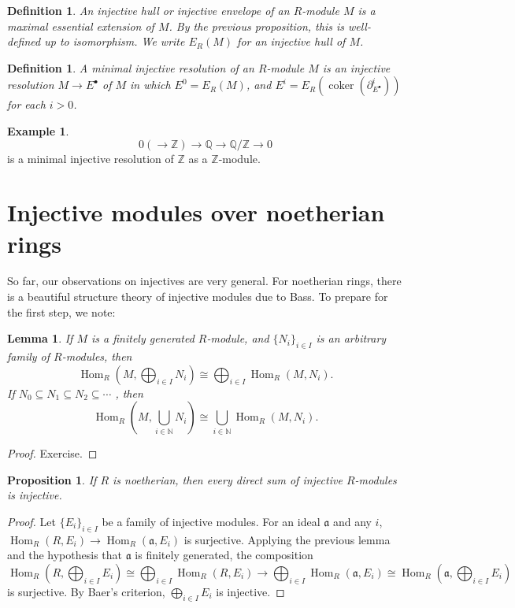 \documentclass[11pt]{book}
\newtheorem{lemma}[theorem]{Lemma}
\newtheorem{proposition}[theorem]{Proposition}
\newtheorem{definition}[theorem]{Definition}
\numberwithin{equation}{section}
\numberwithin{theorem}{chapter}
\theoremstyle{definition}
\newtheorem{example}[theorem]{Example}
\newtheorem*{basic properties}{Basic Properties}
\newtheorem*{Important Remark}{Important Remark}
\theoremstyle{remark}
\newcommand{\NN}{\mathbb{N}}
\newcommand{\ZZ}{\mathbb{Z}}
\newcommand{\QQ}{\mathbb{Q}}
\newcommand{\A}{\mathfrak{a}}
\newcommand{\Hom}{\operatorname{Hom}}
\newcommand{\coker}{\operatorname{coker}}
\begin{document}
\begin{definition}
	An \emph{injective hull} or \emph{injective envelope} of an $R$-module $M$ is a maximal essential extension of $M$. By the previous proposition, this is well-defined up to isomorphism. We write $E_R(M)$ for an injective hull of $M$.
\end{definition}



\begin{definition}
	A \emph{minimal injective resolution} of an $R$-module $M$ is an injective resolution $M \to E^{\bullet}$ of $M$ in which $E^0=E_R(M)$, and $E^i=E_R(\coker(\partial^i_{E^{\bullet}}))$ for each $i>0$.
\end{definition}

\begin{example}
	\[0 (\to \ZZ) \to \QQ \to \QQ/\ZZ \to 0 \] is a minimal injective resolution of $\ZZ$ as a $\ZZ$-module.
\end{example}

\section{Injective modules over noetherian rings}

So far, our observations on injectives are very general. For noetherian rings, there is a beautiful structure theory of injective modules due to Bass. To prepare for the first step, we note:

\begin{lemma} If $M$ is a finitely generated $R$-module, and $\{N_i\}_{i\in I}$ is an arbitrary family of $R$-modules, then 
	\[\Hom_R(M,\bigoplus_{i\in I} N_i)\cong \bigoplus_{i\in I} \Hom_R(M,N_i).\] If $N_0 \subseteq N_1 \subseteq N_2 \subseteq \cdots$ , then 
	\[\Hom_R(M,\bigcup_{i\in \NN} N_i) \cong \bigcup_{i\in \NN}\Hom_R(M, N_i).\]
	\end{lemma}
\begin{proof}
	Exercise.
\end{proof}

\begin{proposition}\label{prop: direct sum of injective}
	If $R$ is noetherian, then every direct sum of injective $R$-modules is injective.
\end{proposition}
\begin{proof}
	Let $\{E_i\}_{i\in I}$ be a family of injective modules. For an ideal $\A$ and any $i$, $\Hom_R(R,E_i)\to \Hom_R(\A,E_i)$ is surjective. Applying the previous lemma and the hypothesis that $\A$ is finitely generated, the composition
	\[ \Hom_R(R,\bigoplus_{i\in I} E_i)\cong \bigoplus_{i\in I} \Hom_R(R,E_i) \to \bigoplus_{i\in I} \Hom_R(\A,E_i) \cong \Hom_R(\A,\bigoplus_{i\in I} E_i) \]
	is surjective. By Baer's criterion, $\bigoplus_{i\in I} E_i$ is injective.
\end{proof}
\end{document}
